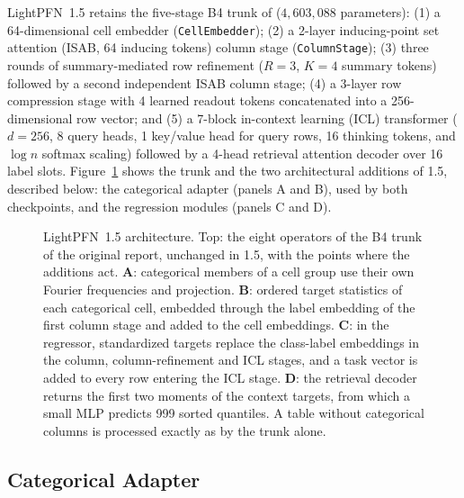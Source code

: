 \documentclass[11pt]{article}
\begin{document}
LightPFN~1.5 retains the five-stage B4 trunk of \cite[Section~2]{ottoboni2026lightpfn} ($4{,}603{,}088$ parameters): %
(1) a 64-dimensional cell embedder (\texttt{CellEmbedder});
(2) a 2-layer inducing-point set attention (ISAB, 64 inducing tokens) column stage (\texttt{ColumnStage});
(3) three rounds of summary-mediated row refinement ($R=3$, $K=4$ summary tokens) followed by a second independent ISAB column stage;
(4) a 3-layer row compression stage with 4 learned readout tokens concatenated into a 256-dimensional row vector; and
(5) a 7-block in-context learning (ICL) transformer ($d=256$, 8 query heads, 1 key/value head for query rows, 16 thinking tokens, and $\log n$ softmax scaling) followed by a 4-head retrieval attention decoder over 16 label slots.
Figure~\ref{fig:arch2} shows the trunk and the two architectural additions of 1.5, described below: the categorical adapter (panels A and B), used by both checkpoints, and the regression modules (panels C and D).

\begin{figure}[tbp]
\centering
\resizebox{\linewidth}{!}{}
\caption{LightPFN~1.5 architecture. Top: the eight operators of the B4 trunk of the original report, unchanged in 1.5, with the points where the additions act. \textbf{A}: categorical members of a cell group use their own Fourier frequencies and projection. \textbf{B}: ordered target statistics of each categorical cell, embedded through the label embedding of the first column stage and added to the cell embeddings. \textbf{C}: in the regressor, standardized targets replace the class-label embeddings in the column, column-refinement and ICL stages, and a task vector is added to every row entering the ICL stage. \textbf{D}: the retrieval decoder returns the first two moments of the context targets, from which a small MLP predicts 999 sorted quantiles. A table without categorical columns is processed exactly as by the trunk alone.}
\label{fig:arch2}
\end{figure}

\subsection{Categorical Adapter}
\label{sec:cat-adapter}
\end{document}
